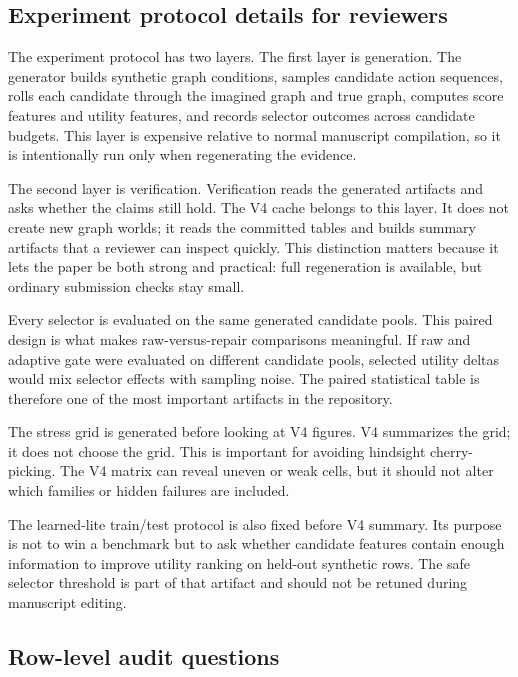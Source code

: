 \documentclass{article}
\begin{document}
\subsection{Experiment protocol details for reviewers}

The experiment protocol has two layers.  The first layer is generation.  The
generator builds synthetic graph conditions, samples candidate action sequences,
rolls each candidate through the imagined graph and true graph, computes score
features and utility features, and records selector outcomes across candidate
budgets.  This layer is expensive relative to normal manuscript compilation, so
it is intentionally run only when regenerating the evidence.

The second layer is verification.  Verification reads the generated artifacts
and asks whether the claims still hold.  The V4 cache belongs to this layer.  It
does not create new graph worlds; it reads the committed tables and builds
summary artifacts that a reviewer can inspect quickly.  This distinction matters
because it lets the paper be both strong and practical: full regeneration is
available, but ordinary submission checks stay small.

Every selector is evaluated on the same generated candidate pools.  This paired
design is what makes raw-versus-repair comparisons meaningful.  If raw and
adaptive gate were evaluated on different candidate pools, selected utility
deltas would mix selector effects with sampling noise.  The paired statistical
table is therefore one of the most important artifacts in the repository.

The stress grid is generated before looking at V4 figures.  V4 summarizes the
grid; it does not choose the grid.  This is important for avoiding hindsight
cherry-picking.  The V4 matrix can reveal uneven or weak cells, but it should not
alter which families or hidden failures are included.

The learned-lite train/test protocol is also fixed before V4 summary.  Its
purpose is not to win a benchmark but to ask whether candidate features contain
enough information to improve utility ranking on held-out synthetic rows.  The
safe selector threshold is part of that artifact and should not be retuned
during manuscript editing.

\subsection{Row-level audit questions}
\end{document}
